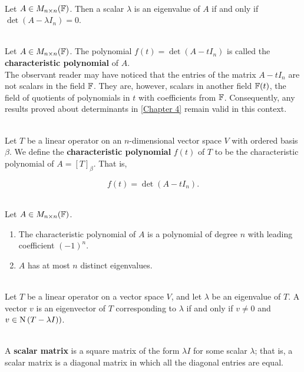\begin{theorem}
	\hfill\\
	Let $A \in M_{n \times n}(\mathbb{F})$. Then a scalar $\lambda$ is an eigenvalue of $A$ if and only if $\det(A - \lambda I_n) = 0$.
\end{theorem}

\begin{definition}
	\hfill\\
	Let $A \in M_{n \times n}(\mathbb{F})$. The polynomial $f(t) = \det(A - tI_n)$ is called the \textbf{characteristic polynomial} of $A$.\\

	The observant reader may have noticed that the entries of the matrix $A - tI_n$ are not scalars in the field $\mathbb{F}$. They are, however, scalars in another field $\mathbb{F}(t)$, the field of quotients of polynomials in $t$ with coefficients from $\mathbb{F}$. Consequently, any results proved about determinants in \autoref{Chapter 4} remain valid in this context.
\end{definition}

\begin{definition}
	\hfill\\
	Let $T$ be a linear operator on an $n$-dimensional vector space $V$ with ordered basis $\beta$. We define the \textbf{characteristic polynomial} $f(t)$ of $T$ to be the characteristic polynomial of $A=[T]_\beta$. That is,

	\[f(t) = \det(A - tI_n).\]
\end{definition}

\begin{theorem}
	\hfill\\
	Let $A \in M_{n \times n}(\mathbb{F})$.

	\begin{enumerate}
		\item The characteristic polynomial of $A$ is a polynomial of degree $n$ with leading coefficient $(-1)^n$.
		\item $A$ has at most $n$ distinct eigenvalues.
	\end{enumerate}
\end{theorem}

\begin{theorem}
	\hfill\\
	Let $T$ be a linear operator on a vector space $V$, and let $\lambda$ be an eigenvalue of $T$. A vector $v$ is an eigenvector of $T$ corresponding to $\lambda$ if and only if $v \neq 0$ and $v \in \text{N}\left(T - \lambda I)\right)$.
\end{theorem}

\begin{definition}
	\hfill\\
	A \textbf{scalar matrix} is a square matrix of the form $\lambda I$ for some scalar $\lambda$; that is, a scalar matrix is a diagonal matrix in which all the diagonal entries are equal.
\end{definition}
